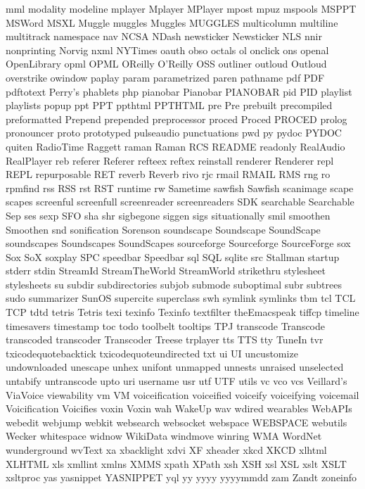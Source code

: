 mml
modality
modeline
mplayer
Mplayer
MPlayer
mpost
mpuz
mspools
MSPPT
MSWord
MSXL
Muggle
muggles
Muggles
MUGGLES
multicolumn
multiline
multitrack
namespace
nav
NCSA
NDash
newsticker
Newsticker
NLS
nnir
nonprinting
Norvig
nxml
NYTimes
oauth
obso
octals
ol
onclick
ons
openal
OpenLibrary
opml
OPML
OReilly
O'Reilly
OSS
outliner
outloud
Outloud
overstrike
owindow
paplay
param
parametrized
paren
pathname
pdf
PDF
pdftotext
Perry's
phablets
php
pianobar
Pianobar
PIANOBAR
pid
PID
playlist
playlists
popup
ppt
PPT
ppthtml
PPTHTML
pre
Pre
prebuilt
precompiled
preformatted
Prepend
prepended
preprocessor
proced
Proced
PROCED
prolog
pronouncer
proto
prototyped
pulseaudio
punctuations
pwd
py
pydoc
PYDOC
quiten
RadioTime
Raggett
raman
Raman
RCS
README
readonly
RealAudio
RealPlayer
reb
referer
Referer
refteex
reftex
reinstall
renderer
Renderer
repl
REPL
repurposable
RET
reverb
Reverb
rivo
rjc
rmail
RMAIL
RMS
rng
ro
rpmfind
rss
RSS
rst
RST
runtime
rw
Sametime
sawfish
Sawfish
scanimage
scape
scapes
screenful
screenfull
screenreader
screenreaders
SDK
searchable
Searchable
Sep
ses
sexp
SFO
sha
shr
sigbegone
siggen
sigs
situationally
smil
smoothen
Smoothen
snd
sonification
Sorenson
soundscape
Soundscape
SoundScape
soundscapes
Soundscapes
SoundScapes
sourceforge
Sourceforge
SourceForge
sox
Sox
SoX
soxplay
SPC
speedbar
Speedbar
sql
SQL
sqlite
src
Stallman
startup
stderr
stdin
StreamId
StreamTheWorld
StreamWorld
strikethru
stylesheet
stylesheets
su
subdir
subdirectories
subjob
submode
suboptimal
subr
subtrees
sudo
summarizer
SunOS
supercite
superclass
swh
symlink
symlinks
tbm
tcl
TCL
TCP
tdtd
tetris
Tetris
texi
texinfo
Texinfo
textfilter
theEmacspeak
tiffcp
timeline
timesavers
timestamp
toc
todo
toolbelt
tooltips
TPJ
transcode
Transcode
transcoded
transcoder
Transcoder
Treese
trplayer
tts
TTS
tty
TuneIn
tvr
txicodequotebacktick
txicodequoteundirected
txt
ui
UI
uncustomize
undownloaded
unescape
unhex
unifont
unmapped
unnests
unraised
unselected
untabify
untranscode
upto
uri
username
usr
utf
UTF
utils
vc
vco
vcs
Veillard's
ViaVoice
viewability
vm
VM
voiceification
voiceified
voiceify
voiceifying
voicemail
Voicification
Voicifies
voxin
Voxin
wah
WakeUp
wav
wdired
wearables
WebAPIs
webedit
webjump
webkit
websearch
websocket
webspace
WEBSPACE
webutils
Wecker
whitespace
widnow
WikiData
windmove
winring
WMA
WordNet
wunderground
wvText
xa
xbacklight
xdvi
XF
xheader
xkcd
XKCD
xlhtml
XLHTML
xls
xmllint
xmlns
XMMS
xpath
XPath
xsh
XSH
xsl
XSL
xslt
XSLT
xsltproc
yas
yasnippet
YASNIPPET
yql
yy
yyyy
yyyymmdd
zam
Zandt
zoneinfo
